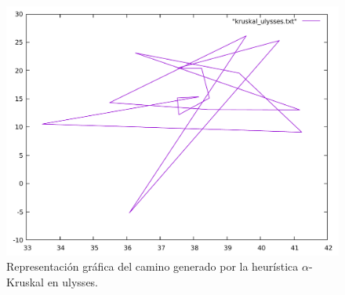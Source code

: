 \begin{figure}[H]
  \centering
  \includegraphics[scale=0.5]{../src/kruskal_ulysses.pdf}
  \caption{Representación gráfica del camino generado por la heurística $\alpha$-Kruskal en ulysses.}
\end{figure} 